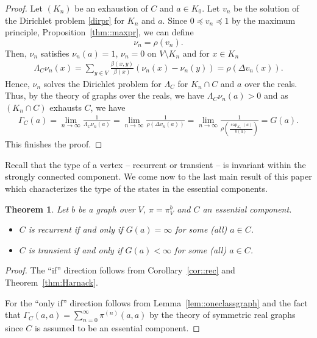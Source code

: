 \documentclass[a4paper,oneside, 12pt]{amsart}
\newtheorem{theorem}{Theorem}
\numberwithin{theorem}{section}
\theoremstyle{definition}
\renewcommand{\c}{\operatorname{cap}}
\newcommand{\G}{{G}}
\newcommand{\prob}{\pi}
\begin{document}
{\begin{proof}
Let $ (K_{n}) $ be an exhaustion of $ C $ and $ a\in K_{0} $. Let $ v_{n} $ be the solution of the Dirichlet problem \eqref{dirpr} for $ K_{n} $ and $ a $.  Since $ 0\preceq v_{n}\preceq 1 $ by the maximum principle, Proposition~\ref{thm::maxpr}, we can define $$  \nu_{n}=\rho (v_{n}) .$$ 
Then, $ \nu_{n} $ satisfies $ \nu_{n}(a) =1$, $ \nu_{n}=0 $ on $ V\setminus K_{n} $ and for $ x\in K_{n} $
\begin{align*}
	\Lambda_{C}\nu_{n}(x) =	\sum_{y\in V} \frac{\beta(x,y)}{\beta(x)}(\nu_{n}(x)-\nu_{n}(y)) = \rho \left(\Delta v_{n}(x)\right).
\end{align*}
Hence, $ \nu_{n} $ solves the Dirichlet problem for $ \Lambda_{C} $ for $ K_{n} \cap C $ and $ a $ over the reals. Thus, by the theory of graphs over the reals, we have $ \Lambda_{C}\nu_{n}(a)>0 $ and as $ (K_{n}\cap C) $ exhausts $ C $, we have
\begin{align*}
	\Gamma_{C}(a)=\lim_{n\to\infty}\frac{1}{\Lambda_{C}\nu_{n}(a)} = \lim_{n\to\infty}\frac{1}{\rho(\Delta v_{n}(a))}= \lim_{n\to\infty}\frac{1}{\rho\left(\frac{\c_{K_{n}}(a)}{b(a)}\right)} = \G(a).
\end{align*}
This finishes the proof.
\end{proof}


Recall that the type of a vertex -- recurrent or transient -- is invariant within the strongly connected component. We come now to the last main result of this paper which characterizes the type of the states in the essential components.


\begin{theorem}\label{thm:charGesscomp}
		Let $b$ be a  graph over $V$,  $ \prob=\prob_{V}^{b} $ and $ C $  an essential component.
		\begin{itemize}
			\item [(a)]  $ C $ is recurrent if and only if $\G(a)=\infty$ for some (all) $a\in C$.
			\item [(b)]  $ C $ is transient if and only if $\G(a)<\infty$ for some (all) $a\in C$.
		\end{itemize}
\end{theorem}
\begin{proof}
	The ``if'' direction follows from Corollary~\ref{cor::rec} and Theorem~\ref{thm:Harnack}.


	For the ``only if'' direction follows from Lemma~\ref{lem::oneclassgraph} and the fact that $ \Gamma_{C}(a,a)=\sum_{n=0}^{\infty} \prob^{(n)}(a,a) $ by the theory of symmetric real graphs since $ C $ is assumed to be an essential component.
\end{proof}

}
\end{document}
